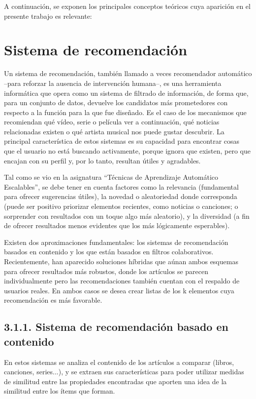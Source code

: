 
A continuación, se exponen los principales conceptos teóricos cuya aparición en el presente trabajo es relevante:

\section{Sistema de recomendación}

Un sistema de recomendación, también llamado a veces recomendador automático –para reforzar la ausencia de intervención humana–, es una herramienta informática que opera como un sistema de filtrado de información, de forma que, para un conjunto de datos, devuelve los candidatos más prometedores con respecto a la función para la que fue diseñado. Es el caso de los mecanismos que recomiendan qué vídeo, serie o película ver a continuación, qué noticias relacionadas existen o qué artista musical nos puede gustar descubrir. La principal característica de estos sistemas es su capacidad para encontrar cosas que el usuario no está buscando activamente, porque ignora que existen, pero que encajan con su perfil y, por lo tanto, resultan útiles y agradables.

Tal como se vio en la asignatura ``Técnicas de Aprendizaje Automático Escalables'', se debe tener en cuenta factores como la relevancia (fundamental para ofrecer sugerencias útiles), la novedad o aleatoriedad donde corresponda (puede ser positivo priorizar elementos recientes, como noticias o canciones; o sorprender con resultados con un toque algo más aleatorio), y la diversidad (a fin de ofrecer resultados menos evidentes que los más lógicamente esperables).

Existen dos aproximaciones fundamentales: los sistemas de recomendación basados en contenido y los que están basados en filtros colaborativos. Recientemente, han aparecido soluciones híbridas que aúnan ambos esquemas para ofrecer resultados más robustos, donde los artículos se parecen individualmente pero las recomendaciones también cuentan con el respaldo de usuarios reales. En ambos casos se desea crear listas de los k elementos cuya recomendación es más favorable.

\subsection{3.1.1. Sistema de recomendación basado en contenido}

En estos sistemas se analiza el contenido de los artículos a comparar (libros, canciones, series...), y se extraen sus características para poder utilizar medidas de similitud entre las propiedades encontradas que aporten una idea de la similitud entre los ítems que forman.

